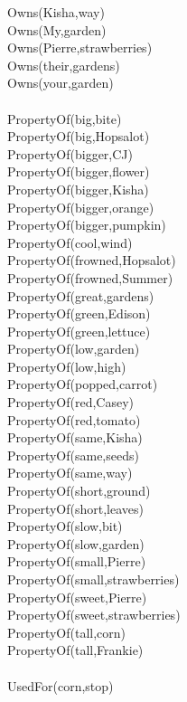 \begin{multicols}{2}
\begin{footnotesize}
Owns(Kisha,way) \\
Owns(My,garden) \\
Owns(Pierre,strawberries) \\
Owns(their,gardens) \\
Owns(your,garden) \\
~\\
PropertyOf(big,bite) \\
PropertyOf(big,Hopsalot) \\
PropertyOf(bigger,CJ) \\
PropertyOf(bigger,flower) \\
PropertyOf(bigger,Kisha) \\
PropertyOf(bigger,orange) \\
PropertyOf(bigger,pumpkin) \\
PropertyOf(cool,wind) \\
PropertyOf(frowned,Hopsalot) \\
PropertyOf(frowned,Summer) \\
PropertyOf(great,gardens) \\
PropertyOf(green,Edison) \\
PropertyOf(green,lettuce) \\
PropertyOf(low,garden) \\
PropertyOf(low,high) \\
PropertyOf(popped,carrot) \\
PropertyOf(red,Casey) \\
PropertyOf(red,tomato) \\
PropertyOf(same,Kisha) \\
PropertyOf(same,seeds) \\
PropertyOf(same,way) \\
PropertyOf(short,ground) \\
PropertyOf(short,leaves) \\
PropertyOf(slow,bit) \\
PropertyOf(slow,garden) \\
PropertyOf(small,Pierre) \\
PropertyOf(small,strawberries) \\
PropertyOf(sweet,Pierre) \\
PropertyOf(sweet,strawberries) \\
PropertyOf(tall,corn) \\
PropertyOf(tall,Frankie) \\
~\\
UsedFor(corn,stop) \\
\end{footnotesize}
\end{multicols}


